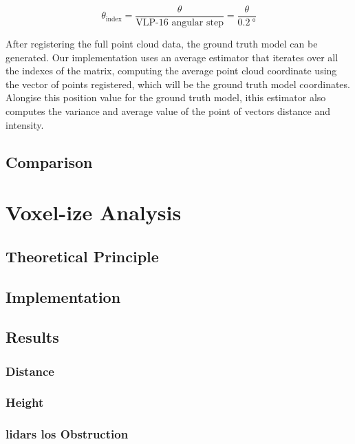 \begin{equation}
	\label{eq:azimuthal-angle-index}
	\theta_{\text{index}} = \frac{\theta}{\text{VLP-16 angular step}} = \frac{\theta}{\SI{0.2}{\degree}} 
\end{equation}

After registering the full point cloud data, the ground truth model can be generated. Our implementation uses an average estimator that iterates over all the indexes of the matrix, computing the average point cloud coordinate using the vector of points registered, which will be the ground truth model coordinates. Alongise this position value for the ground truth model, ithis estimator also computes the variance and average value of the point of vectors distance and intensity.



\subsection{Comparison}


\section{Voxel-ize Analysis}
\subsection{Theoretical Principle}
\subsection{Implementation}
\subsection{Results}
\subsubsection{Distance}
\subsubsection{Height}
\subsubsection{\acp{lidar} \ac{los} Obstruction}
